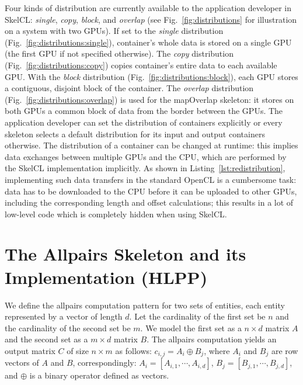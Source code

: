 Four kinds of distribution are currently available to the application developer in SkelCL:
\emph{single}, \emph{copy}, \emph{block}, and \emph{overlap} (see Fig.~\ref{fig:distributions} for illustration on a system with two GPUs).
If set to the \emph{single} distribution (Fig.~\ref{fig:distributions:single}), container's whole data is stored on a single GPU (the first GPU if not specified otherwise).
The \emph{copy} distribution (Fig.~\ref{fig:distributions:copy}) copies container's entire data to each available GPU.
With the \emph{block} distribution (Fig.~\ref{fig:distributions:block}), each GPU stores a contiguous, disjoint block of the container.
The \emph{overlap} distribution (Fig.~\ref{fig:distributions:overlap}) is used for the mapOverlap skeleton:
it stores on both GPUs a common block of data from the border between the GPUs.
The application developer can set the distribution of containers explicitly or every skeleton selects a default distribution for its input and output containers otherwise.
The distribution of a container can be changed at runtime:
this implies data exchanges between multiple GPUs and the CPU, which are performed by the SkelCL implementation implicitly.
As shown in Listing~\ref{lst:redistribution}, implementing such data transfers in the standard OpenCL is a cumbersome task:
data has to be downloaded to the CPU before it can be uploaded to other GPUs, including the corresponding length and offset calculations;
this results in a lot of low-level code which is completely hidden when using SkelCL.





\section{The Allpairs Skeleton and its Implementation (HLPP)}
\label{sec:allpairs_skeleton}

\label{sec:formal_def}
We define the allpairs computation pattern for two sets of entities, each entity represented by a vector of length $d$.
Let the cardinality of the first set be $n$ and the cardinality of the second set be $m$.
We model the first set as a $n\times d$ matrix $A$ and the second set as a $m\times d$ matrix $B$.
The allpairs computation yields an output matrix $C$ of size $n\times m$ as follows:
$c_{i, j} = A_i \oplus B_j$, where $A_i$ and $B_j$ are row vectors of $A$ and $B$, correspondingly:
$A_i = [A_{i,1}, \cdots, A_{i, d}]$, $B_j = [B_{j,1}, \cdots, B_{j,d}]$, and $\oplus$ is a binary operator defined as vectors.

